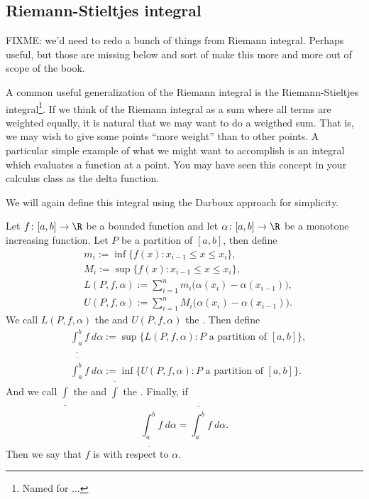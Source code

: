 
\subsection{Riemann-Stieltjes integral}

FIXME: we'd need to redo a bunch of things from Riemann integral.
Perhaps useful, but those are missing below and sort of make this more and
more out of scope of the book.

A common useful generalization of the Riemann integral is the
Riemann-Stieltjes integral\footnote{Named for ...}.
If we think of the Riemann integral as a sum where all terms are weighted
equally, it is natural that we may want to do a weigthed sum.
That is, we may wish to give some points ``more weight''
than to other points.  A particular simple example of what we might want to
accomplish is an integral which evaluates a function at a point.  You may
have seen this concept in your calculus class as the
delta function.

We will again define this integral using the Darboux approach for
simplicity.

\begin{defn}
Let $f \colon [a,b] \to \R$ be a bounded function and let
$\alpha \colon [a,b] \to \R$ be a monotone increasing function.
Let $P$ be a partition of $[a,b]$, then define
\begin{align*}
& m_i := \inf \{ f(x) : x_{i-1} \leq x \leq x_i \} , \\
& M_i := \sup \{ f(x) : x_{i-1} \leq x \leq x_i \} , \\
& L(P,f,\alpha) :=
\sum_{i=1}^n m_i \bigl( \alpha(x_i) - \alpha(x_{i-1}) \bigr) , \\
& U(P,f,\alpha) :=
\sum_{i=1}^n M_i \bigl( \alpha(x_i) - \alpha(x_{i-1}) \bigr) .
\end{align*}
We call $L(P,f,\alpha)$ the \emph{} and
$U(P,f,\alpha)$ the \emph{}.
Then define
\begin{align*}
& \underline{\int_a^b} f~d\alpha := \sup \{ L(P,f,\alpha) : P \text{ a
partition of $[a,b]$} \} , \\
& \overline{\int_a^b} f~d\alpha := \inf \{ U(P,f,\alpha) : P \text{ a
partition of $[a,b]$} \} .
\end{align*}
And we call $\underline{\int}$ the \emph{} and
$\overline{\int}$ the \emph{}.
Finally, if 
\begin{equation*}
\underline{\int_a^b} f~d\alpha = \overline{\int_a^b} f~d\alpha .
\end{equation*}
Then we say that $f$ is \emph{}
with respect to $\alpha$.
\end{defn}


